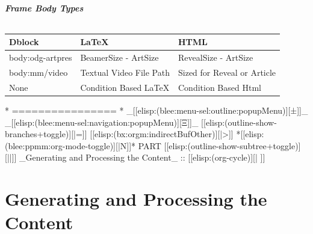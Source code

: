 \begin{whenOrg}
\begin{verblatex}

\begin{frame}[fragile,label=frameBodyTypes]
    \frametitle{Frame Body Types}
    \framesubtitle{}

\small
\begin{tabular}{|p{1.2in}|p{1.75in}|p{1.75in}|}
  \hline
  \textbf{Dblock} & \textbf{LaTeX} & \textbf{HTML} \\
  \hline
  body:odg-artpres & BeamerSize - ArtSize & RevealSize - ArtSize \\
  \hline
  body:mm/video & Textual Video File Path & Sized for Reveal or Article \\
  \hline
  None & Condition Based LaTeX & Condition Based Html \\
  \hline
\end{tabular}
\normalsize




\end{frame}
\end{verblatex}


\begin{whenOrg}
*      ================
*  _[[elisp:(blee:menu-sel:outline:popupMenu)][±]]_ _[[elisp:(blee:menu-sel:navigation:popupMenu)][Ξ]]_ [[elisp:(outline-show-branches+toggle)][|=]] [[elisp:(bx:orgm:indirectBufOther)][|>]] *[[elisp:(blee:ppmm:org-mode-toggle)][|N]]*  PART       [[elisp:(outline-show-subtree+toggle)][||]]   _Generating and Processing the Content_ ::  [[elisp:(org-cycle)][| ]]
\end{whenOrg}

\newpage
\part{Generating and Processing the Content}


\end{whenOrg}
